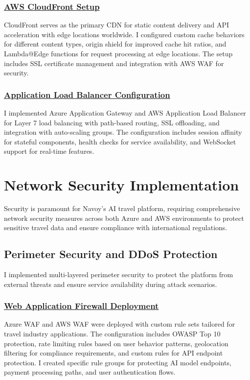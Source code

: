 \subsubsection*{\underline{AWS CloudFront Setup}}
CloudFront serves as the primary CDN for static content delivery and API acceleration with edge locations worldwide. I configured custom cache behaviors for different content types, origin shield for improved cache hit ratios, and Lambda@Edge functions for request processing at edge locations. The setup includes SSL certificate management and integration with AWS WAF for security.

\subsubsection*{\underline{Application Load Balancer Configuration}}
I implemented Azure Application Gateway and AWS Application Load Balancer for Layer 7 load balancing with path-based routing, SSL offloading, and integration with auto-scaling groups. The configuration includes session affinity for stateful components, health checks for service availability, and WebSocket support for real-time features.

\section{Network Security Implementation}
Security is paramount for Navoy's AI travel platform, requiring comprehensive network security measures across both Azure and AWS environments to protect sensitive travel data and ensure compliance with international regulations.

\subsection{Perimeter Security and DDoS Protection}
I implemented multi-layered perimeter security to protect the platform from external threats and ensure service availability during attack scenarios.

\subsubsection*{\underline{Web Application Firewall Deployment}}
Azure WAF and AWS WAF were deployed with custom rule sets tailored for travel industry applications. The configuration includes OWASP Top 10 protection, rate limiting rules based on user behavior patterns, geolocation filtering for compliance requirements, and custom rules for API endpoint protection. I created specific rule groups for protecting AI model endpoints, payment processing paths, and user authentication flows.

